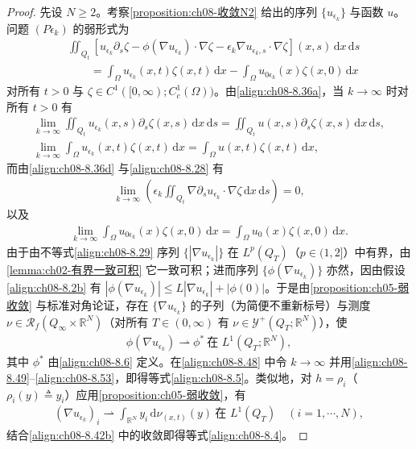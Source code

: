 \documentclass[../../main.tex]{subfiles}%
\begin{document}
\begin{proof}
先设 $N\geqslant2$。考察\cref{proposition:ch08-收敛N2} 给出的序列 $\{u_{\epsilon_k}\}$ 与函数 $u$。问题 $(P\epsilon_k)$ 的弱形式为
\begin{align}
&\iint_{Q_t}[u_{\epsilon_k}\partial_s\zeta-\phi(\nabla u_{\epsilon_k})\cdot\nabla\zeta-\epsilon_k\nabla u_{\epsilon_k,s}\cdot\nabla\zeta](x,s)\,\mathrm{d}x\,\mathrm{d}s\nonumber\\
&\qquad=\int_\Omega u_{\epsilon_k}(x,t)\zeta(x,t)\,\mathrm{d}x-\int_\Omega u_{0\epsilon_k}(x)\zeta(x,0)\,\mathrm{d}x \label{align:ch08-8.48}
\end{align}
对所有 $t>0$ 与 $\zeta\in C^1([0,\infty);C^1_c(\Omega))$。由\eqref{align:ch08-8.36a}，当 $k\to\infty$ 时对所有 $t>0$ 有
\begin{align}
\lim_{k\to\infty}\iint_{Q_t}u_{\epsilon_k}(x,s)\partial_s\zeta(x,s)\,\mathrm{d}x\,\mathrm{d}s
=\iint_{Q_t}u(x,s)\partial_s\zeta(x,s)\,\mathrm{d}x\,\mathrm{d}s, \label{align:ch08-8.49}\\
\lim_{k\to\infty}\int_\Omega u_{\epsilon_k}(x,t)\zeta(x,t)\,\mathrm{d}x
=\int_\Omega u(x,t)\zeta(x,t)\,\mathrm{d}x, \label{align:ch08-8.50}
\end{align}
而由\eqref{align:ch08-8.36d} 与\eqref{align:ch08-8.28} 有
\begin{align}
\lim_{k\to\infty}\left(\epsilon_k\iint_{Q_t}\nabla\partial_s u_{\epsilon_k}\cdot\nabla\zeta\,\mathrm{d}x\,\mathrm{d}s\right)=0, \label{align:ch08-8.51}
\end{align}
以及
\begin{align}
\lim_{k\to\infty}\int_\Omega u_{0\epsilon_k}(x)\zeta(x,0)\,\mathrm{d}x
=\int_\Omega u_0(x)\zeta(x,0)\,\mathrm{d}x. \label{align:ch08-8.52}
\end{align}
由于由不等式\eqref{align:ch08-8.29} 序列 $\{|\nabla u_{\epsilon_k}|\}$ 在 $L^p(Q_T)$（$p\in(1,2]$）中有界，由\cref{lemma:ch02-有界一致可积} 它一致可积；进而序列 $\{\phi(\nabla u_{\epsilon_k})\}$ 亦然，因由假设\eqref{align:ch08-8.2b} 有 $|\phi(\nabla u_{\epsilon_k})|\leqslant L|\nabla u_{\epsilon_k}|+|\phi(0)|$。于是由\cref{proposition:ch05-弱收敛} 与标准对角论证，存在 $\{\nabla u_{\epsilon_k}\}$ 的子列（为简便不重新标号）与测度 $\nu\in\mathscr{R}_f(Q_\infty\times\mathbb{R}^N)$（对所有 $T\in(0,\infty)$ 有 $\nu\in\mathcal{Y}^+(Q_T;\mathbb{R}^N)$），使
\begin{align}
\phi(\nabla u_{\epsilon_k})\rightharpoonup\phi^*\ \text{在 }L^1(Q_T;\mathbb{R}^N), \label{align:ch08-8.53}
\end{align}
其中 $\phi^*$ 由\eqref{align:ch08-8.6} 定义。在\eqref{align:ch08-8.48} 中令 $k\to\infty$ 并用\eqref{align:ch08-8.49}--\eqref{align:ch08-8.53}，即得等式\eqref{align:ch08-8.5}。类似地，对 $h=\rho_i$（$\rho_i(y)\triangleq y_i$）应用\cref{proposition:ch05-弱收敛}，有
\begin{align*}
(\nabla u_{\epsilon_k})_i\rightharpoonup\int_{\mathbb{R}^N}y_i\,\mathrm{d}\nu_{(x,t)}(y)\ \text{在 }L^1(Q_T)\quad(i=1,\cdots ,N),
\end{align*}
结合\eqref{align:ch08-8.42b} 中的收敛即得等式\eqref{align:ch08-8.4}。


\end{proof}
\end{document}
